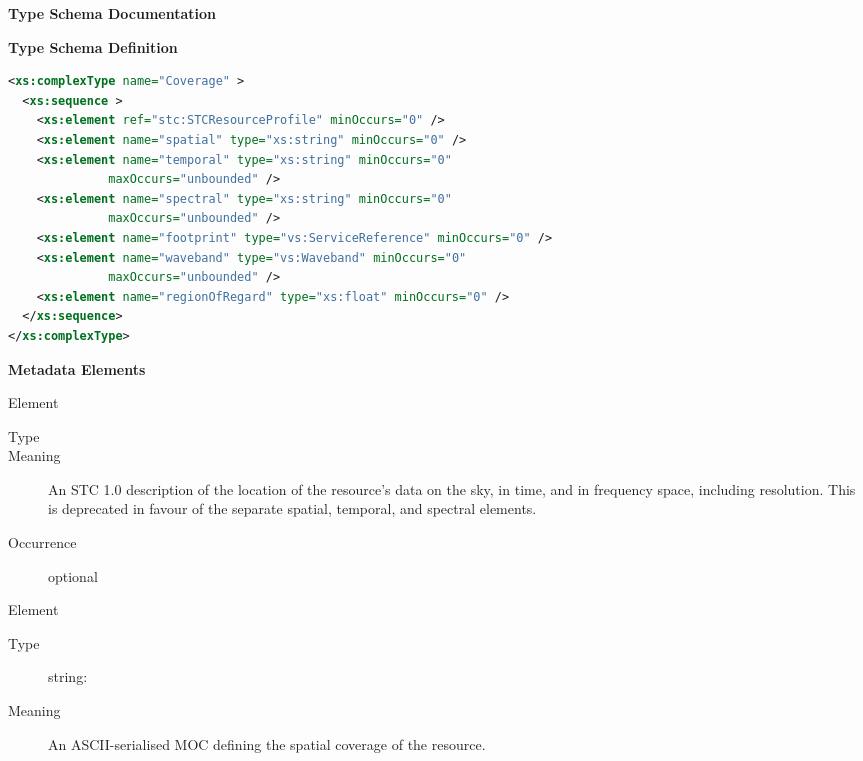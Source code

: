 \documentclass[11pt,a4paper]{ivoa}
\begin{document}
\begin{generated}
\begingroup
      	\renewcommand*\descriptionlabel[1]{%
      	\hbox to 5.5em{\emph{#1}\hfil}}\vspace{2ex}\noindent\textbf{ Type Schema Documentation}


\vspace{1ex}\noindent\textbf{ Type Schema Definition}

\begin{lstlisting}[language=XML,basicstyle=\footnotesize]
<xs:complexType name="Coverage" >
  <xs:sequence >
    <xs:element ref="stc:STCResourceProfile" minOccurs="0" />
    <xs:element name="spatial" type="xs:string" minOccurs="0" />
    <xs:element name="temporal" type="xs:string" minOccurs="0"
              maxOccurs="unbounded" />
    <xs:element name="spectral" type="xs:string" minOccurs="0"
              maxOccurs="unbounded" />
    <xs:element name="footprint" type="vs:ServiceReference" minOccurs="0" />
    <xs:element name="waveband" type="vs:Waveband" minOccurs="0"
              maxOccurs="unbounded" />
    <xs:element name="regionOfRegard" type="xs:float" minOccurs="0" />
  </xs:sequence>
</xs:complexType>
\end{lstlisting}

\vspace{0.5ex}\noindent\textbf{ Metadata Elements}

\begingroup\small\begin{bigdescription}\item[Element \xmlel{}]
\begin{description}
\item[Type] 
\item[Meaning] 
                 An STC 1.0 description of the location of the resource's 
                 data on the sky, in time, and in frequency space, 
                 including resolution.   This is deprecated in favour
                 of the separate spatial, temporal, and spectral elements.
               
\item[Occurrence] optional

\end{description}
\item[Element \xmlel{spatial}]
\begin{description}
\item[Type] string: 
\item[Meaning] 
                  An ASCII-serialised MOC defining the spatial coverage 
                  of the resource.
               

\end{description}
\end{bigdescription}
\end{generated}
\end{document}

